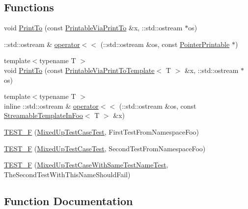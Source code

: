 \subsection*{Functions}
\begin{DoxyCompactItemize}
\item 
void \hyperlink{namespacefoo_ac435de653934c97045bbdba8c8afbe3f}{Print\+To} (const \hyperlink{structfoo_1_1_printable_via_print_to}{Printable\+Via\+Print\+To} \&x, \+::std\+::ostream $\ast$os)
\item 
\+::std\+::ostream \& \hyperlink{namespacefoo_a65f8809f6af7f69f5cc842493caf4491}{operator$<$$<$} (\+::std\+::ostream \&os, const \hyperlink{structfoo_1_1_pointer_printable}{Pointer\+Printable} $\ast$)
\item 
{\footnotesize template$<$typename T $>$ }\\void \hyperlink{namespacefoo_a7b78eba501ea7ff1226a8cb40b6e3d92}{Print\+To} (const \hyperlink{classfoo_1_1_printable_via_print_to_template}{Printable\+Via\+Print\+To\+Template}$<$ T $>$ \&x, \+::std\+::ostream $\ast$os)
\item 
{\footnotesize template$<$typename T $>$ }\\inline \+::std\+::ostream \& \hyperlink{namespacefoo_abe04f604d114085b0b9af25600ef00da}{operator$<$$<$} (\+::std\+::ostream \&os, const \hyperlink{classfoo_1_1_streamable_template_in_foo}{Streamable\+Template\+In\+Foo}$<$ T $>$ \&x)
\item 
\hyperlink{namespacefoo_a0d50eecc97df56ae625078848ba9c98a}{T\+E\+S\+T\+\_\+F} (\hyperlink{classfoo_1_1_mixed_up_test_case_test}{Mixed\+Up\+Test\+Case\+Test}, First\+Test\+From\+Namespace\+Foo)
\item 
\hyperlink{namespacefoo_a7911fd62b6ae405016caed779b2f95dc}{T\+E\+S\+T\+\_\+F} (\hyperlink{classfoo_1_1_mixed_up_test_case_test}{Mixed\+Up\+Test\+Case\+Test}, Second\+Test\+From\+Namespace\+Foo)
\item 
\hyperlink{namespacefoo_a2bc2a2547ff38da0ecf68676e75583cd}{T\+E\+S\+T\+\_\+F} (\hyperlink{classfoo_1_1_mixed_up_test_case_with_same_test_name_test}{Mixed\+Up\+Test\+Case\+With\+Same\+Test\+Name\+Test}, The\+Second\+Test\+With\+This\+Name\+Should\+Fail)
\end{DoxyCompactItemize}


\subsection{Function Documentation}
\mbox{\label{namespacefoo_a65f8809f6af7f69f5cc842493caf4491}} 
